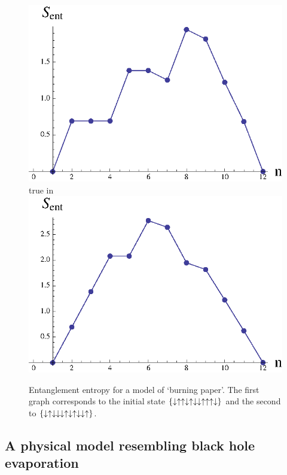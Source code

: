 \documentclass[12pt]{article}
\begin{document}
\begin{figure}[htbp]
\begin{center}
\includegraphics[scale=.58]{burning1p.eps} true in
\includegraphics[scale=.58]{burning2p.eps}
\caption{{Entanglement entropy for a model of `burning paper'. The first graph corresponds to the initial state $\{\downarrow\uparrow\uparrow\downarrow\uparrow\downarrow\downarrow\uparrow\uparrow\uparrow\downarrow\}$ and the second to $\{\downarrow\uparrow\downarrow\downarrow\downarrow\uparrow\downarrow\uparrow\downarrow\downarrow\uparrow \} $.}}
\label{fn7m}
\end{center}
\end{figure}


\subsection{A physical model resembling black hole evaporation}
\end{document}
